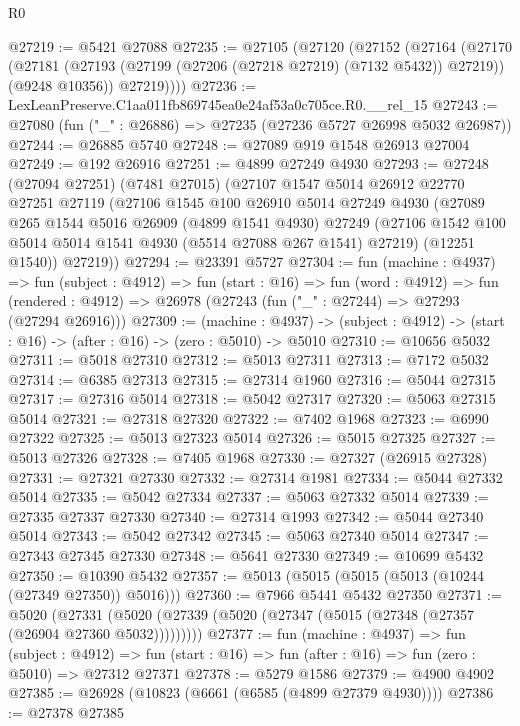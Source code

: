 \begin{lexlean}{R0}
\begin{coremodule}
@27219 := @5421 @27088
@27235 := @27105
    (@27120
      (@27152
        (@27164
          (@27170
            (@27181 (@27193 (@27199 (@27206 (@27218 @27219) (@7132 @5432)) @27219)) (@9248 @10356))
            @27219))))
@27236 := LexLeanPreserve.C1aa011fb869745ea0e24af53a0c705ce.R0.__rel_15
@27243 := @27080 (fun ("_" : @26886) => @27235 (@27236 @5727 @26998 @5032 @26987))
@27244 := @26885 @5740
@27248 := @27089 @919 @1548 @26913 @27004
@27249 := @192 @26916
@27251 := @4899 @27249 @4930
@27293 := @27248
    (@27094 @27251)
    (@7481 @27015)
    (@27107
      @1547
      @5014
      @26912
      @22770
      @27251
      @27119
      (@27106
        @1545
        @100
        @26910
        @5014
        @27249
        @4930
        (@27089
          @265
          @1544
          @5016
          @26909
          (@4899 @1541 @4930)
          @27249
          (@27106 @1542 @100 @5014 @5014 @1541 @4930 (@5514 @27088 @267 @1541) @27219)
          (@12251 @1540))
        @27219))
@27294 := @23391 @5727
@27304 := fun (machine : @4937) =>
  fun (subject : @4912) =>
  fun (start : @16) =>
  fun (word : @4912) =>
  fun (rendered : @4912) => @26978 (@27243 (fun ("_" : @27244) => @27293 (@27294 @26916)))
@27309 := (machine : @4937) ->
  (subject : @4912) -> (start : @16) -> (after : @16) -> (zero : @5010) -> @5010
@27310 := @10656 @5032
@27311 := @5018 @27310
@27312 := @5013 @27311
@27313 := @7172 @5032
@27314 := @6385 @27313
@27315 := @27314 @1960
@27316 := @5044 @27315
@27317 := @27316 @5014
@27318 := @5042 @27317
@27320 := @5063 @27315 @5014
@27321 := @27318 @27320
@27322 := @7402 @1968
@27323 := @6990 @27322
@27325 := @5013 @27323 @5014
@27326 := @5015 @27325
@27327 := @5013 @27326
@27328 := @7405 @1968
@27330 := @27327 (@26915 @27328)
@27331 := @27321 @27330
@27332 := @27314 @1981
@27334 := @5044 @27332 @5014
@27335 := @5042 @27334
@27337 := @5063 @27332 @5014
@27339 := @27335 @27337 @27330
@27340 := @27314 @1993
@27342 := @5044 @27340 @5014
@27343 := @5042 @27342
@27345 := @5063 @27340 @5014
@27347 := @27343 @27345 @27330
@27348 := @5641 @27330
@27349 := @10699 @5432
@27350 := @10390 @5432
@27357 := @5013 (@5015 (@5015 (@5013 (@10244 (@27349 @27350)) @5016)))
@27360 := @7966 @5441 @5432 @27350
@27371 := @5020
    (@27331 (@5020 (@27339 (@5020 (@27347 (@5015 (@27348 (@27357 (@26904 @27360 @5032)))))))))
@27377 := fun (machine : @4937) =>
  fun (subject : @4912) =>
  fun (start : @16) => fun (after : @16) => fun (zero : @5010) => @27312 @27371
@27378 := @5279 @1586
@27379 := @4900 @4902
@27385 := @26928 (@10823 (@6661 (@6585 (@4899 @27379 @4930))))
@27386 := @27378 @27385

\end{coremodule}
\end{lexlean}
